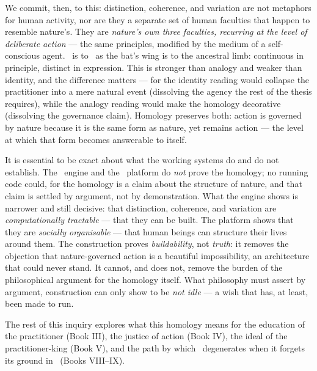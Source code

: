 We commit, then, to this: distinction, coherence, and variation are not metaphors
for human activity, nor are they a separate set of human faculties that happen to
resemble nature's. They are \emph{nature's own three faculties, recurring at the
level of deliberate action} --- the same principles, modified by the medium of a
self-conscious agent. \praxis\ is to \physis\ as the bat's wing is to the
ancestral limb: continuous in principle, distinct in expression. This is stronger
than analogy and weaker than identity, and the difference matters --- for the
identity reading would collapse the practitioner into a mere natural event
(dissolving the agency the rest of the thesis requires), while the analogy
reading would make the homology decorative (dissolving the governance claim).
Homology preserves both: action is governed by nature because it is the same
form as nature, yet remains action --- the level at which that form becomes
answerable to itself.

It is essential to be exact about what the working systems do and do not
establish. The \physis\ engine and the \praxis\ platform do \emph{not} prove the
homology; no running code could, for the homology is a claim about the structure
of nature, and that claim is settled by argument, not by demonstration. What the
engine shows is narrower and still decisive: that distinction, coherence, and
variation are \emph{computationally tractable} --- that they can be built. The
platform shows that they are \emph{socially organisable} --- that human beings
can structure their lives around them. The construction proves \emph{buildability},
not \emph{truth}: it removes the objection that nature-governed action is a
beautiful impossibility, an architecture that could never stand. It cannot, and
does not, remove the burden of the philosophical argument for the homology
itself. What philosophy must assert by argument, construction can only show to be
\emph{not idle} --- a wish that has, at least, been made to run.

The rest of this inquiry explores what this homology means for the education
of the practitioner (Book III), the justice of action (Book IV), the ideal of
the practitioner-king (Book V), and the path by which \praxis\ degenerates when
it forgets its ground in \physis\ (Books VIII--IX).

